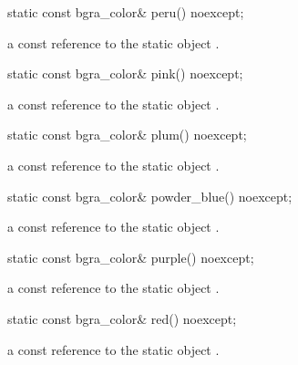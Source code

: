 \begin{itemdecl}
static const bgra_color& peru() noexcept;
\end{itemdecl}
\begin{itemdescr}
\pnum
\returns
a const reference to the static  object .
\end{itemdescr}

\begin{itemdecl}
static const bgra_color& pink() noexcept;
\end{itemdecl}
\begin{itemdescr}
\pnum
\returns
a const reference to the static  object .
\end{itemdescr}

\begin{itemdecl}
static const bgra_color& plum() noexcept;
\end{itemdecl}
\begin{itemdescr}
\pnum
\returns
a const reference to the static  object .
\end{itemdescr}

\begin{itemdecl}
static const bgra_color& powder_blue() noexcept;
\end{itemdecl}
\begin{itemdescr}
\pnum
\returns
a const reference to the static  object .
\end{itemdescr}

\begin{itemdecl}
static const bgra_color& purple() noexcept;
\end{itemdecl}
\begin{itemdescr}
\pnum
\returns
a const reference to the static  object .
\end{itemdescr}

\begin{itemdecl}
static const bgra_color& red() noexcept;
\end{itemdecl}
\begin{itemdescr}
\pnum
\returns
a const reference to the static  object .
\end{itemdescr}

